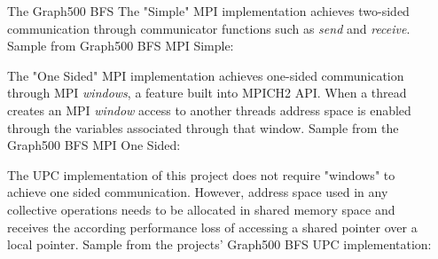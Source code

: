 \documentclass[final]{beamer}
\newlength{\sepwid}
\newlength{\onecolwid}
\begin{document}
\begin{frame}[t]
\begin{columns}[t]
\begin{column}{\onecolwid}
\begin{block}{The Graph500 BFS}
					The "Simple" MPI implementation achieves two-sided communication through communicator functions such as  \emph{send} and \emph{receive}. Sample from Graph500 BFS MPI Simple:\vspace{2 mm}
					
					 \vspace{5 mm}
					  The "One Sided" MPI implementation achieves one-sided communication through MPI \emph{windows}, a feature built into MPICH2 API.  When a thread creates an MPI \emph{window} access to another threads address space is enabled through the variables associated through that window.  Sample from the Graph500 BFS MPI One Sided: 
					  \vspace{2 mm}
					   
					  \vspace{5 mm}
					  The UPC implementation of this project does not require "windows" to achieve one sided communication.  However, address space used in any collective operations needs to be allocated in shared memory space and receives the according performance loss of accessing a shared pointer over a local pointer.  Sample from the projects' Graph500 BFS UPC implementation: 
					  \vspace{2 mm}
					   
				\end{block}
		\end{column}
		\begin{column}{\sepwid}\end{column}			%
	 \end{columns}
\end{frame}
\end{document}
